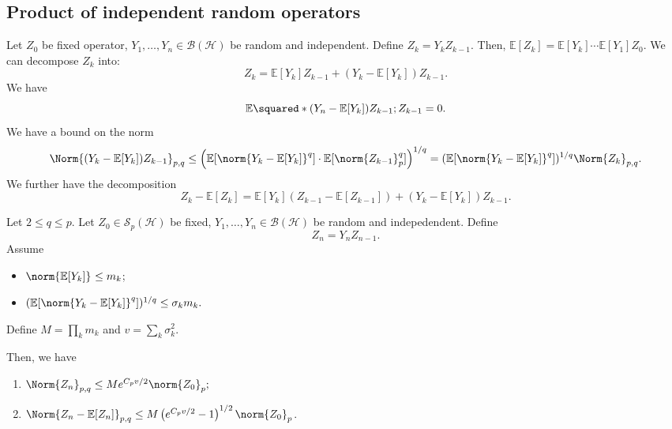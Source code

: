 \subsection{Product of independent random operators}

\begin{lem}
    Let \( Z_0 \) be fixed operator, \( Y_1,\dots,Y_n \in \mathcal{B}(\mathcal{H}) \) be random and independent. Define 
    \( Z_k=Y_k Z_{k-1} \). Then, \( \mathbb{E}[Z_k] =  \mathbb{E}[Y_k] \cdots \mathbb{E}[Y_1]Z_0\). We can decompose \( Z_k \) into:
    \[ Z_k = \mathbb{E}[Y_k]Z_{k-1} + (Y_k-\mathbb{E}[Y_k])Z_{k-1}. \]
    We have 
    \[ \mathbb{E}\squared*{(Y_n-\mathbb{E}[Y_k])Z_{k-1};Z_{k-1}}=0. \]
    We have a bound on the norm 
    \[\Norm{(Y_{k}-\mathbb{E}[Y_k])Z_{k-1}}_{p,q} \leq \left(\mathbb{E}[ \norm{Y_k-\mathbb{E}[Y_k]}_{}^{q}] \cdot \mathbb{E} [\norm{Z_{k-1}}_{p}^{q}]\right)^{1/q} = (\mathbb{E} [\norm{Y_k-\mathbb{E}[Y_k]}_{}^{q}])^{1/q} \Norm{Z_k}_{p,q}. \]
    We further have the decomposition
    \[ Z_k - \mathbb{E}[Z_k] = \mathbb{E}[Y_k](Z_{k-1}-\mathbb{E}[Z_{k-1}]) + (Y_k-\mathbb{E}[Y_{k}])Z_{k-1} .\]
\end{lem}


\begin{thm}
    Let \( 2 \leq q \leq p \). Let \( Z_0 \in \mathcal{S}_{p}(\mathcal{H}) \) be fixed, \( Y_1,\dots,Y_n \in \mathcal{B}(\mathcal{H}) \) be random and indepedendent. Define
    \[ Z_n = Y_nZ_{n-1}. \]
    Assume 
    \begin{itemize}
      \item \( \norm{\mathbb{E}[Y_k]}_{} \leq m_k \);
      \item \( (\mathbb{E}[\norm{Y_k-\mathbb{E}[Y_k]}_{}^{q}])^{1/q} \leq \sigma_k m_k. \)
    \end{itemize}
    Define \( M= \prod_{k}^{}m_k \) and \( v= \sum_{k}^{}\sigma_k^{2} \).

    Then, we have
   \begin{enumerate}[1)]
     \item \( \Norm{Z_n}_{p,q} \leq Me^{C_p v/2} \norm{Z_0}_p{}; \)
     \item \( \Norm{Z_n-\mathbb{E}[Z_n]}_{p,q} \leq M \left(e^{C_pv/2}-1\right)^{1/2}\norm{Z_0}_{p} \).
   \end{enumerate}   
\end{thm}

